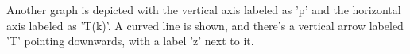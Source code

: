 Another graph is depicted with the vertical axis labeled as 'p' and the horizontal axis labeled as 'T(k)'. A curved line is shown, and there's a vertical arrow labeled 'T' pointing downwards, with a label 'z' next to it.